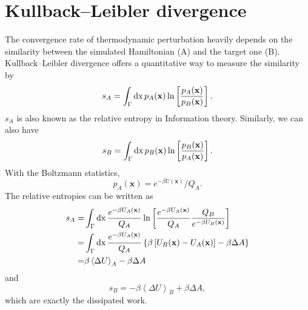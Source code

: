 \section{Kullback–Leibler divergence\label{Sec:Eva:KLDverg}}
The convergence rate of thermodynamic perturbation heavily depends on the similarity between the simulated Hamiltonian (A) and the target one (B). Kullback–Leibler divergence offers a quantitative way to measure the similarity by
\begin{equation}
	s_A=\int_\Gamma \mathop{}\!\mathrm{d} \mathrm{x}\, p_A(\mathbf{x})\ln\left[\frac{p_A(\mathbf{x})}{p_B(\mathbf{x})}\right].
\end{equation}
$s_A$ is also known as the relative entropy in Information theory. Similarly, we can also have
\begin{equation}
	s_B=\int_\Gamma \mathop{}\!\mathrm{d} \mathrm{x}\, p_B(\mathbf{x})\ln\left[\frac{p_B(\mathbf{x})}{p_A(\mathbf{x})}\right].
\end{equation}
With the Boltzmann statistics,
\begin{equation}
	p_A(\mathbf{x})=e^{-\beta U(\mathbf{x})}/Q_A.
\end{equation}
The relative entropies can be written as
\begin{align}
	s_A=&\int_\Gamma \mathop{}\!\mathrm{d} \mathrm{x}\, \frac{e^{-\beta U_A(\mathbf{x})}}{Q_A}\ln\left[\frac{e^{-\beta U_A(\mathbf{x})}}{Q_A}\frac{Q_B}{e^{-\beta U_B(\mathbf{x})}}\right]\notag\\
	   =&\int_\Gamma \mathop{}\!\mathrm{d} \mathrm{x}\, \frac{e^{-\beta U_A(\mathbf{x})}}{Q_A} \left\{\beta \left[U_B(\mathbf{x})-U_A(\mathbf{x})\right]-\beta \Delta A\right\}\\
	   =&\beta\left<\Delta U\right>_A-\beta \Delta A
\end{align}
and
\begin{equation}
	s_B=-\beta\left<\Delta U\right>_B+\beta \Delta A,
\end{equation}
which are exactly the dissipated work\cite{WuJCP2005}.

